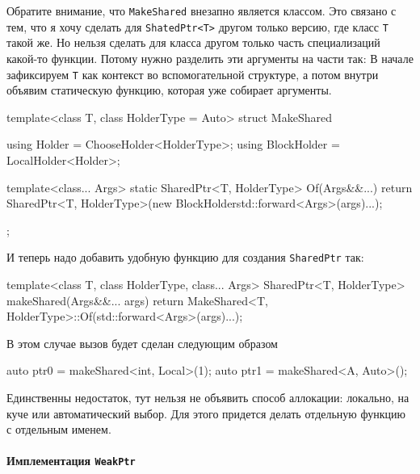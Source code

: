 Обратите внимание, что \verb"MakeShared" внезапно является классом.
Это связано с тем, что я хочу сделать для \verb"ShatedPtr<T>" другом только версию, где класс \verb"T" такой же.
Но нельзя сделать для класса другом только часть специализаций какой-то функции.
Потому нужно разделить эти аргументы на части так: В начале зафиксируем \verb"T" как контекст во вспомогательной структуре, а потом внутри объявим статическую функцию, которая уже собирает аргументы.
\begin{cppcode}
template<class T, class HolderType = Auto>
struct MakeShared {
  using Holder = ChooseHolder<HolderType>;
  using BlockHolder = LocalHolder<Holder>;
  
  template<class... Args>
  static SharedPtr<T, HolderType> Of(Args&&...) {
    return SharedPtr<T, HolderType>(new BlockHolder{std::forward<Args>(args)...});
  }
};
\end{cppcode}
И теперь надо добавить удобную функцию для создания \verb"SharedPtr" так:
\begin{cppcode}
template<class T, class HolderType, class... Args>
SharedPtr<T, HolderType> makeShared(Args&&... args) {
  return MakeShared<T, HolderType>::Of(std::forward<Args>(args)...);
}
\end{cppcode}
В этом случае вызов будет сделан следующим образом
\begin{cppcode}
auto ptr0 = makeShared<int, Local>(1);
auto ptr1 = makeShared<A, Auto>();
\end{cppcode}
Единственны недостаток, тут нельзя не объявить способ аллокации: локально, на куче или автоматический выбор.
Для этого придется делать отдельную функцию с отдельным именем.

\paragraph{Имплементация \texttt{WeakPtr}}

